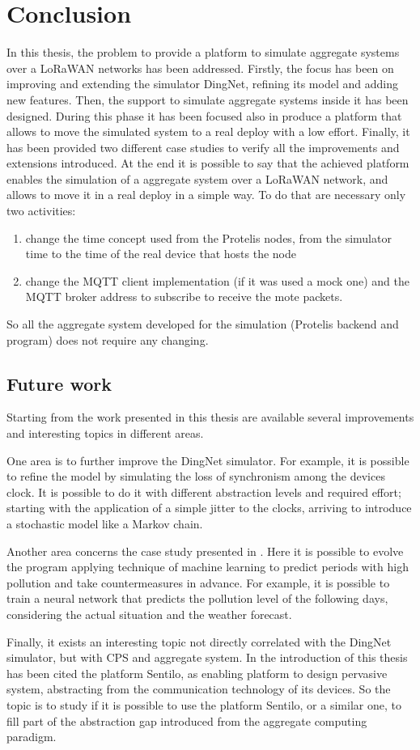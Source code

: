 \chapter{Conclusion}
\label{chap:conclusions}
 
In this thesis, the problem to provide a platform to simulate aggregate systems over a LoRaWAN networks has been addressed.
Firstly, the focus has been on improving and extending the simulator DingNet, refining its model and adding new features.
Then, the support to simulate aggregate systems inside it has been designed. 
During this phase it has been focused also in produce a platform that allows to move the simulated system to a real deploy with a low effort.
Finally, it has been provided two different case studies to verify all the improvements and extensions introduced.
At the end it is possible to say that the achieved platform enables the simulation of a aggregate system over a LoRaWAN network, and allows to move it in a real deploy in a simple way. 
To do that are necessary only two activities:
\begin{enumerate}
    \item change the time concept used from the Protelis nodes, from the simulator time to the time of the real device that hosts the node
    \item change the MQTT client implementation (if it was used a mock one) and the MQTT broker address to subscribe to receive the mote packets.
\end{enumerate}
 So all the aggregate system developed for the simulation (Protelis backend and program) does not require any changing.

\section{Future work}
Starting from the work presented in this thesis are available several improvements and interesting topics in different areas.

One area is to further improve the DingNet simulator. 
For example, it is possible to refine the model by simulating the loss of synchronism among the devices clock. It is possible to do it with different abstraction levels and required effort; starting with the application of a simple jitter to the clocks, arriving to introduce a stochastic model like a Markov chain.

Another area concerns the case study presented in . 
Here it is possible to evolve the program applying technique of machine learning to predict periods with high pollution and take countermeasures in advance. 
For example, it is possible to train a neural network that predicts the pollution level of the following days, considering the actual situation and the weather forecast.

Finally, it exists an interesting topic not directly correlated with the DingNet simulator, but with CPS and aggregate system. 
In the introduction of this thesis has been cited the platform Sentilo, as enabling platform to design pervasive system, abstracting from the communication technology of its devices.
So the topic is to study if it is possible to use the platform Sentilo, or a similar one, to fill part of the abstraction gap introduced from the aggregate computing paradigm.
